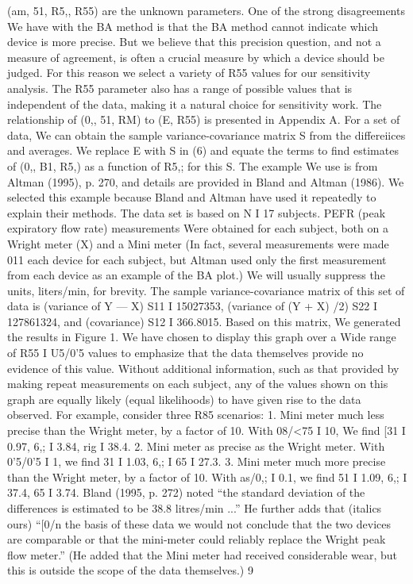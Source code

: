 (am, 51, R5,, R55) are the unknown parameters.
One of the strong disagreements We have with the BA method is that the BA
method cannot indicate which device is more precise. But we believe that this precision
question, and not a measure of agreement, is often a crucial measure by which a device
should be judged. For this reason we select a variety of R55 values for our sensitivity
analysis. The R55 parameter also has a range of possible values that is independent
of the data, making it a natural choice for sensitivity work.
The relationship of (0,, 51, RM) to (E, R55) is presented in Appendix A. For a set
of data, We can obtain the sample variance-covariance matrix S from the differeiices
and averages. We replace E with S in (6) and equate the terms to ﬁnd estimates of
(0,, B1, R5,) as a function of R5,; for this S.
The example We use is from Altman (1995), p. 270, and details are provided in
Bland and Altman (1986). We selected this example because Bland and Altman have
used it repeatedly to explain their methods. The data set is based on N I 17 subjects.
PEFR (peak expiratory ﬂow rate) measurements Were obtained for each subject, both
on a Wright meter (X) and a Mini meter  (In fact, several measurements were
made 011 each device for each subject, but Altman used only the ﬁrst measurement
from each device as an example of the BA plot.) We will usually suppress the units,
liters/min, for brevity. The sample variance-covariance matrix of this set of data is
(variance of Y — X) S11 I 15027353, (variance of (Y + X) /2) S22 I 127861324,
and (covariance) S12 I 366.8015.
Based on this matrix, We generated the results in Figure 1. We have chosen to
display this graph over a Wide range of R55 I U5/0'5 values to emphasize that the
data themselves provide no evidence of this value. Without additional information,
such as that provided by making repeat measurements on each subject, any of the
values shown on this graph are equally likely (equal likelihoods) to have given rise to
the data observed.
For example, consider three R85 scenarios:
1. Mini meter much less precise than the Wright meter, by a factor of 10. With
08/<75 I 10, We ﬁnd [31 I 0.97, 6,; I 3.84, rig I 38.4.
2. Mini meter as precise as the Wright meter. With 0'5/0'5 I 1, we ﬁnd 31 I 1.03,
6,; I 65 I 27.3.
3. Mini meter much more precise than the Wright meter, by a factor of 10. With
as/0,; I 0.1, we ﬁnd 51 I 1.09, 6,; I 37.4, 65 I 3.74.
Bland (1995, p. 272) noted “the standard deviation of the differences is estimated
to be 38.8 litres/min ...” He further adds that (italics ours) “[0/n the basis of these
data we would not conclude that the two devices are comparable or that the mini-meter
could reliably replace the Wright peak flow meter.” (He added that the Mini meter
had received considerable wear, but this is outside the scope of the data themselves.)
9



